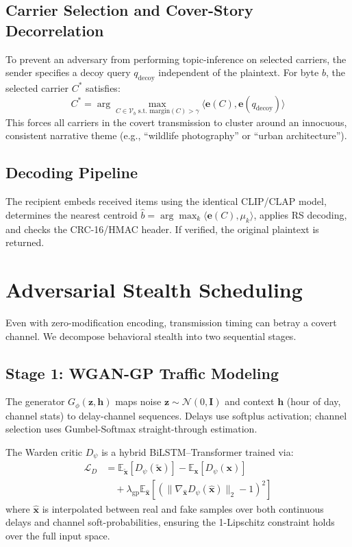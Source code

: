 \documentclass[conference]{IEEEtran}
\begin{document}
\subsection{Carrier Selection and Cover-Story Decorrelation}

To prevent an adversary from performing topic-inference on selected carriers, the sender specifies a decoy query $q_{\text{decoy}}$ independent of the plaintext. For byte $b$, the selected carrier $C^*$ satisfies:
\begin{equation}
C^* = \arg\max_{C \in \mathcal{V}_b \text{ s.t. margin}(C) > \gamma} \langle \mathbf{e}(C), \mathbf{e}(q_{\text{decoy}}) \rangle
\end{equation}
This forces all carriers in the covert transmission to cluster around an innocuous, consistent narrative theme (e.g., ``wildlife photography'' or ``urban architecture'').

\subsection{Decoding Pipeline}

The recipient embeds received items using the identical CLIP/CLAP model, determines the nearest centroid $\hat{b} = \arg\max_k \langle \mathbf{e}(C), \mu_k \rangle$, applies RS decoding, and checks the CRC-16/HMAC header. If verified, the original plaintext is returned.

\section{Adversarial Stealth Scheduling}

Even with zero-modification encoding, transmission timing can betray a covert channel. We decompose behavioral stealth into two sequential stages.

\subsection{Stage 1: WGAN-GP Traffic Modeling}

The generator $G_{\phi}(\mathbf{z}, \mathbf{h})$ maps noise $\mathbf{z} \sim \mathcal{N}(0, \mathbf{I})$ and context $\mathbf{h}$ (hour of day, channel stats) to delay-channel sequences. Delays use softplus activation; channel selection uses Gumbel-Softmax straight-through estimation.

The Warden critic $D_{\psi}$ is a hybrid BiLSTM--Transformer trained via:
\begin{align}
\mathcal{L}_D &= \mathbb{E}_{\tilde{\mathbf{x}}}[D_{\psi}(\tilde{\mathbf{x}})] - \mathbb{E}_{\mathbf{x}}[D_{\psi}(\mathbf{x})] \nonumber \\
&\quad + \lambda_{\text{gp}} \mathbb{E}_{\hat{\mathbf{x}}}[(\|\nabla_{\hat{\mathbf{x}}} D_{\psi}(\hat{\mathbf{x}})\|_2 - 1)^2]
\end{align}
where $\hat{\mathbf{x}}$ is interpolated between real and fake samples over both continuous delays and channel soft-probabilities, ensuring the 1-Lipschitz constraint holds over the full input space.
\end{document}
